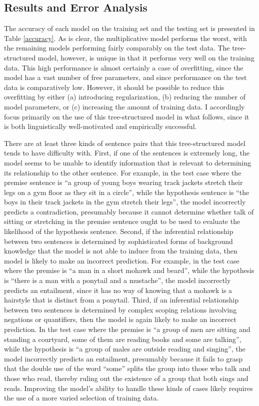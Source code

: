 \subsection{Results and Error Analysis}

The accuracy of each model on the training set and the testing set is presented in Table \ref{accuracy}. As is clear, the multiplicative model performs the worst, with the remaining models performing fairly comparably on the test data. The tree-structured model, however, is unique in that it performs very well on the training data. This high performance is almost certainly a case of overfitting, since the model has a vast number of free parameters, and since performance on the test data is comparatively low. However, it should be possible to reduce this overfitting by either (a) introducing regularization, (b) reducing the number of model parameters, or (c) increasing the amount of training data. I accordingly focus primarily on the use of this tree-structured model in what follows, since it is both linguistically well-motivated and empirically successful.

There are at least three kinds of sentence pairs that this tree-structured model tends to have difficulty with. First, if one of the sentences is extremely long, the model seems to be unable to identify information that is relevant to determining its relationship to the other sentence. For example, in the test case where the premise sentence is ``a group of young boys wearing track jackets stretch their legs on a gym floor as they sit in a circle'', while the hypothesis sentence is ``the boys in their track jackets in the gym stretch their legs'', the model incorrectly predicts a contradiction, presumably because it cannot determine whether talk of sitting or stretching in the premise sentence ought to be used to evaluate the likelihood of the hypothesis sentence. Second, if the inferential relationship between two sentences is determined by sophisticated forms of background knowledge that the model is not able to induce from the training data, then model is likely to make an incorrect prediction. For example, in the test case where the premise is ``a man in a short mohawk and beard'', while the hypothesis is ``there is a man with a ponytail and a mustache'', the model incorrectly predicts an entailment, since it has no way of knowing that a mohawk is a hairstyle that is distinct from a ponytail. Third, if an inferential relationship between two sentences is determined by complex scoping relations involving negations or quantifiers, then the model is again likely to make an incorrect prediction. In the test case where the premise is ``a group of men are sitting and standing a courtyard, some of them are reading books and some are talking'', while the hypothesis is ``a group of males are outside reading and singing'', the model incorrectly predicts an entailment, presumably because it fails to grasp that the double use of the word ``some'' splits the group into those who talk and those who read, thereby ruling out the existence of a group that both sings and reads. Improving the model's ability to handle these kinds of cases likely requires the use of a more varied selection of training data.  


